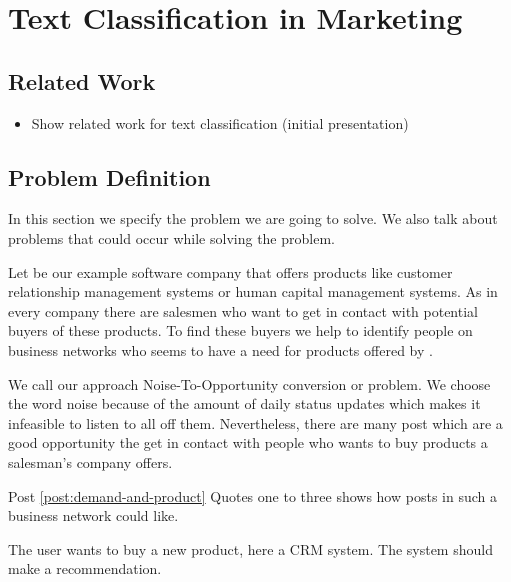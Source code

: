 
\section{Text Classification in Marketing}
\label{sec:background}

\subsection{Related Work}

\begin{itemize}
	\item Show related work for text classification (initial presentation)
\end{itemize}

\subsection{Problem Definition}
\label{sec:background-problem}

In this section we specify the problem we are going to solve. We also talk about problems that could occur while solving the problem. 

Let \acme be our example software company that offers products like customer relationship management systems or human capital management systems. 
As in every company there are salesmen who want to get in contact with potential buyers of these products. 
To find these buyers we help \acme to identify people on business networks who seems to have a need for products offered by \acme.

We call our approach Noise-To-Opportunity conversion or \nto problem.
We choose the word noise because of the amount of daily status updates which makes it infeasible to listen to all off them.
Nevertheless, there are many post which are a good opportunity the get in contact with people who wants to buy products a salesman's company offers. 

Post \ref{post:demand-and-product}
Quotes one to three shows how posts in such a business network could like. 

\begin{post}
	\centering
	\caption{The user wants to buy a new product, here a CRM system. The system should make a recommendation.}
	\label{post:demand-and-product}
\end{post}


